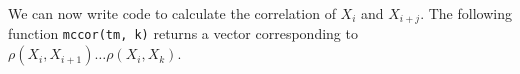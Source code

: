 \documentclass[12pt]{article}
\begin{document}
We can now write code to calculate the correlation of $X_i$ and $X_{i+j}$. The following
function \texttt{mccor(tm, k)} returns a vector corresponding to 
$\rho(X_i, X_{i+1}) \dots \rho(X_i, X_k)$. 

\lstset{
  basicstyle=\small,
  stringstyle=\ttfamily,
  numbers=left,
  numberstyle=\tiny,
  stepnumber=1, 
  numbersep=5pt,
  language=R }


\end{document}
